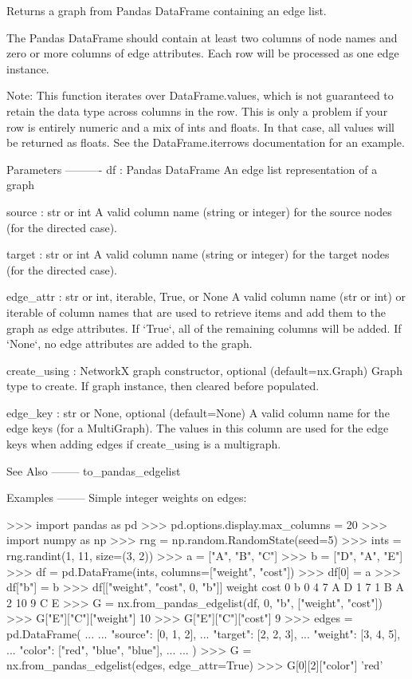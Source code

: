 \begin{DoxyVerb}Returns a graph from Pandas DataFrame containing an edge list.

The Pandas DataFrame should contain at least two columns of node names and
zero or more columns of edge attributes. Each row will be processed as one
edge instance.

Note: This function iterates over DataFrame.values, which is not
guaranteed to retain the data type across columns in the row. This is only
a problem if your row is entirely numeric and a mix of ints and floats. In
that case, all values will be returned as floats. See the
DataFrame.iterrows documentation for an example.

Parameters
----------
df : Pandas DataFrame
    An edge list representation of a graph

source : str or int
    A valid column name (string or integer) for the source nodes (for the
    directed case).

target : str or int
    A valid column name (string or integer) for the target nodes (for the
    directed case).

edge_attr : str or int, iterable, True, or None
    A valid column name (str or int) or iterable of column names that are
    used to retrieve items and add them to the graph as edge attributes.
    If `True`, all of the remaining columns will be added.
    If `None`, no edge attributes are added to the graph.

create_using : NetworkX graph constructor, optional (default=nx.Graph)
    Graph type to create. If graph instance, then cleared before populated.

edge_key : str or None, optional (default=None)
    A valid column name for the edge keys (for a MultiGraph). The values in
    this column are used for the edge keys when adding edges if create_using
    is a multigraph.

See Also
--------
to_pandas_edgelist

Examples
--------
Simple integer weights on edges:

>>> import pandas as pd
>>> pd.options.display.max_columns = 20
>>> import numpy as np
>>> rng = np.random.RandomState(seed=5)
>>> ints = rng.randint(1, 11, size=(3, 2))
>>> a = ["A", "B", "C"]
>>> b = ["D", "A", "E"]
>>> df = pd.DataFrame(ints, columns=["weight", "cost"])
>>> df[0] = a
>>> df["b"] = b
>>> df[["weight", "cost", 0, "b"]]
   weight  cost  0  b
0       4     7  A  D
1       7     1  B  A
2      10     9  C  E
>>> G = nx.from_pandas_edgelist(df, 0, "b", ["weight", "cost"])
>>> G["E"]["C"]["weight"]
10
>>> G["E"]["C"]["cost"]
9
>>> edges = pd.DataFrame(
...     {
...         "source": [0, 1, 2],
...         "target": [2, 2, 3],
...         "weight": [3, 4, 5],
...         "color": ["red", "blue", "blue"],
...     }
... )
>>> G = nx.from_pandas_edgelist(edges, edge_attr=True)
>>> G[0][2]["color"]
'red'


\end{DoxyVerb}
